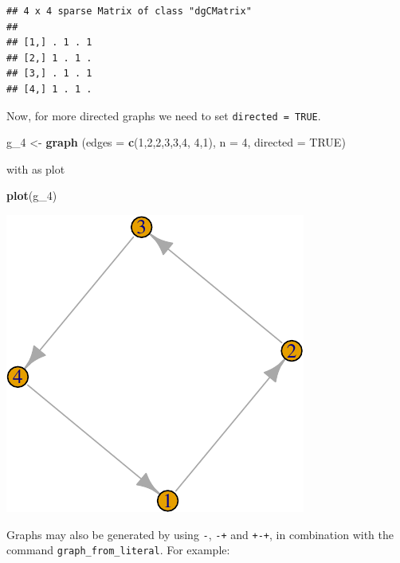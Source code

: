 \documentclass[]{article}
\newenvironment{Shaded}{\begin{snugshade}}{\end{snugshade}}
\newcommand{\KeywordTok}[1]{\textcolor[rgb]{0.13,0.29,0.53}{\textbf{#1}}}
\newcommand{\DataTypeTok}[1]{\textcolor[rgb]{0.13,0.29,0.53}{#1}}
\newcommand{\DecValTok}[1]{\textcolor[rgb]{0.00,0.00,0.81}{#1}}
\newcommand{\StringTok}[1]{\textcolor[rgb]{0.31,0.60,0.02}{#1}}
\newcommand{\OtherTok}[1]{\textcolor[rgb]{0.56,0.35,0.01}{#1}}
\newcommand{\NormalTok}[1]{#1}
\theoremstyle{definition}
\theoremstyle{definition}
\theoremstyle{definition}
\theoremstyle{remark}
\begin{document}
\begin{verbatim}
## 4 x 4 sparse Matrix of class "dgCMatrix"
##             
## [1,] . 1 . 1
## [2,] 1 . 1 .
## [3,] . 1 . 1
## [4,] 1 . 1 .
\end{verbatim}

Now, for more directed graphs we need to set \texttt{directed\ =\ TRUE}.

\begin{Shaded}
\begin{Highlighting}[]
\NormalTok{g_}\DecValTok{4}\NormalTok{ <-}\StringTok{ }\KeywordTok{graph}\NormalTok{ (}\DataTypeTok{edges =} \KeywordTok{c}\NormalTok{(}\DecValTok{1}\NormalTok{,}\DecValTok{2}\NormalTok{,}\DecValTok{2}\NormalTok{,}\DecValTok{3}\NormalTok{,}\DecValTok{3}\NormalTok{,}\DecValTok{4}\NormalTok{, }\DecValTok{4}\NormalTok{,}\DecValTok{1}\NormalTok{), }\DataTypeTok{n =} \DecValTok{4}\NormalTok{, }\DataTypeTok{directed =} \OtherTok{TRUE}\NormalTok{)}
\end{Highlighting}
\end{Shaded}

with as plot

\begin{Shaded}
\begin{Highlighting}[]
\KeywordTok{plot}\NormalTok{(g_}\DecValTok{4}\NormalTok{)}
\end{Highlighting}
\end{Shaded}

\includegraphics{ResearchTools_files/figure-latex/unnamed-chunk-46-1.pdf}

Graphs may also be generated by using \texttt{-}, \texttt{-+} and
\texttt{+-+}, in combination with the command
\texttt{graph\_from\_literal}. For example:
\end{document}
